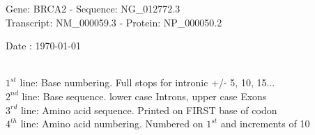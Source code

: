 \documentclass{article}
\begin{document}
\renewcommand{\footrulewidth}{1pt}
\renewcommand{\headrulewidth}{0pt}
\begin{center}
\begin{large}
Gene: BRCA2 - Sequence: NG\_012772.3\\
Transcript: NM\_000059.3 - Protein: NP\_000050.2
 
 Date : \today\\\\
\end{large}
\end{center}
$1^{st}$ line: Base numbering. Full stops for intronic +/- 5, 10, 15...\\
$2^{nd}$ line: Base sequence. lower case Introns, upper case Exons\\
$3^{rd}$ line: Amino acid sequence. Printed on FIRST base of codon\\
$4^{th}$ line: Amino acid numbering. Numbered on $1^{st}$ and increments of 10\\
\end{document}
